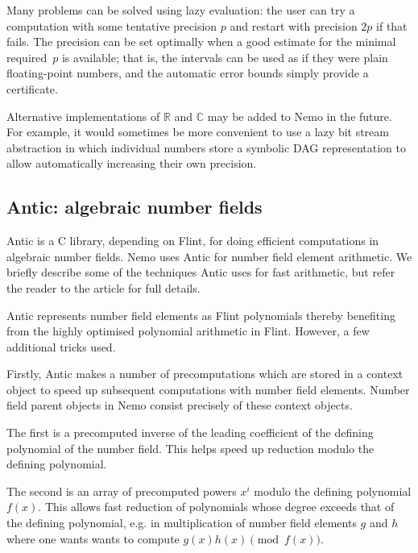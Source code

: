 \documentclass{sig-alternate-05-2015}
\begin{document}
Many problems can be solved using lazy evaluation: the user can
try a computation with some tentative precision $p$ and restart
with precision $2p$ if that fails. The precision can be set
optimally when a good estimate for the minimal
required~$p$ is available; that is, the intervals
can be used as if they were plain floating-point numbers, and the automatic
error bounds simply provide a certificate.

Alternative implementations of $\mathbb{R}$ and $\mathbb{C}$
may be added to Nemo in the future.
For example, it would sometimes be more convenient to use a lazy
bit stream abstraction in which individual numbers
store a symbolic DAG representation to allow automatically
increasing their own precision.


\subsection{Antic: algebraic number fields}

Antic is a C library, depending on Flint, for
doing efficient computations in algebraic number fields. 
Nemo uses Antic for number field element arithmetic. We briefly describe some
of the techniques Antic uses for fast arithmetic, but
refer the reader to the article \cite{antic} for full details.

Antic represents number field elements as Flint polynomials thereby benefiting
from the highly optimised polynomial arithmetic in Flint. However, a few
additional tricks used.

Firstly, Antic makes a number of precomputations which are stored in a context
object to speed up subsequent computations with number field elements. Number field parent
objects in Nemo consist precisely of these context objects.

The first is a precomputed inverse of the leading coefficient of the defining
polynomial of the number field. This helps speed up reduction modulo the defining polynomial.

The second is an array of precomputed powers $x^i$ modulo the
defining polynomial $f(x)$. This allows fast reduction of polynomials whose degree exceeds
that of the defining polynomial, e.g. in multiplication of number field elements $g$ and $h$
where one wants wants to compute $g(x)h(x) \pmod{f(x)}$.
\end{document}
